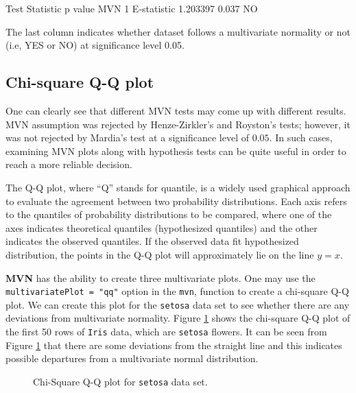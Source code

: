 \documentclass[11pt]{article}
\begin{document}
\begin{Schunk}
\begin{Soutput}
         Test Statistic p value MVN
1 E-statistic  1.203397   0.037  NO
\end{Soutput}
\end{Schunk}

The last column indicates whether dataset follows a multivariate normality or not (i.e, YES or NO) at significance level 0.05.

\subsection{Chi-square Q-Q plot}

One can clearly see that different MVN tests may come up with different results. MVN assumption was rejected by Henze-Zirkler's and Royston's tests; however, it was not rejected by Mardia's test at a significance level of $0.05$. In such cases, examining MVN plots along with hypothesis tests can be quite useful in order to reach a more reliable decision.

The Q-Q plot, where ``Q'' stands for quantile, is a widely used graphical approach to evaluate the agreement between two probability distributions. Each axis refers to the quantiles of probability distributions to be compared, where one of the axes indicates theoretical quantiles (hypothesized quantiles) and the other indicates the observed quantiles. If the observed data fit hypothesized distribution, the points in the Q-Q plot will approximately lie on the line $y = x$.

\textbf{MVN} has the ability to create three multivariate plots. One may use the \texttt{multivariatePlot = "qq"} option in the \texttt{mvn}, function to create a chi-square Q-Q plot. We can create this plot for the \texttt{setosa} data set to see whether there are any deviations from multivariate normality. Figure \ref{qq:iris4} shows the chi-square Q-Q plot of the first 50 rows of \texttt{Iris} data, which are \texttt{setosa} flowers. It can be seen from Figure \ref{qq:iris4} that there are some deviations from the straight line and this indicates possible departures from a multivariate normal distribution.

\begin{figure}[htb]
  \centering
  \scalebox{0.5}{
  }
  \caption{Chi-Square Q-Q plot for \texttt{setosa} data set.} \label{qq:iris4}
\end{figure}
\end{document}
